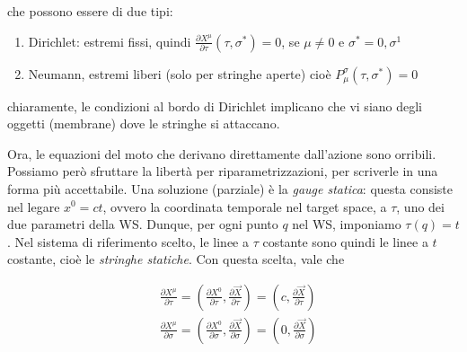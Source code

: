 \documentclass{report}
\begin{document}
che possono essere di due tipi: 

\begin{enumerate}
    \item Dirichlet: estremi fissi, quindi \(\frac{\partial X^\mu}{\partial \tau}(\tau, \sigma^*) =0\), se \(\mu \neq 0\) e \(\sigma^* = 0, \sigma^1\)
    \item Neumann, estremi liberi (solo per stringhe aperte) cioè \(P^\sigma_\mu (\tau, \sigma^*) =0\)
\end{enumerate}

chiaramente, le condizioni al bordo di Dirichlet implicano che vi siano degli oggetti (membrane) dove le stringhe si attaccano. 

Ora, le equazioni del moto che derivano direttamente dall'azione sono orribili. Possiamo però sfruttare la libertà per riparametrizzazioni, per scriverle in una forma più accettabile. Una soluzione (parziale) è la \emph{gauge statica}: questa consiste nel legare \(x^0 = ct\), ovvero la coordinata temporale nel target space, a \(\tau\), uno dei due parametri della WS. Dunque, per ogni punto \(q\) nel WS, imponiamo \(\tau(q) = t\). Nel sistema di riferimento scelto, le linee a \(\tau\) costante sono quindi le linee a \(t\) costante, cioè le \emph{stringhe statiche}. Con questa scelta, vale che 

\begin{align}
        &\frac{\partial X^\mu}{\partial \tau} = \left(\frac{\partial X^0}{\partial \tau}, \frac{\partial \vec{X}}{\partial \tau}  \right) = \left( c, \frac{\partial \vec{X}}{\partial \tau}  \right) \\
        &\frac{\partial X^\mu}{\partial \sigma} = \left(\frac{\partial X^0}{\partial \sigma}, \frac{\partial \vec{X}}{\partial \sigma}  \right) = \left( 0, \frac{\partial \vec{X}}{\partial \sigma}  \right) 
\end{align}
\end{document}

